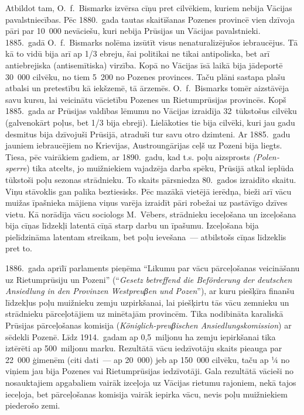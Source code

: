 \documentclass[twoside,a5paper,12pt,fleqn,openany]{extbook}
\newcommand{\detxti}[1]{\textit{\textgerman{#1}}}
\begin{document}
Atbildot tam, O.~f.~Bismarks izvērsa cīņu pret cilvēkiem, kuriem nebija Vācijas pavalstniecības. Pēc 1880.~gada tautas skaitīšanas Pozenes provincē vien dzīvoja pāri par 10~000 nevāciešu, kuri nebija Prūsijas un Vācijas pavalstnieki. 1885.~gadā O.~f.~Bismarks nolēma izsūtīt visus nenaturalizējušos iebraucējus. Tā kā to vidū bija arī ap 1/3 ebreju, šai politikai ne tikai antipoliska, bet arī antiebrejiska (antisemītiska) virzība. Kopā no Vācijas īsā laikā bija jādeportē 30~000 cilvēku, no tiem 5~200 no Pozenes provinces. Taču plāni sastapa plašu atbalsi un pretestību kā iekšzemē, tā ārzemēs. O.~f.~Bismarks tomēr aizstāvēja savu kursu, lai veicinātu vācietību Pozenes un Rietumprūsijas provincēs. Kopš 1885.~gada ar Prūsijas valdības lēmumu no Vācijas izraidīja 32~tūkstošus cilvēku (galvenokārt poļus, bet 1/3 bija ebreji). Lielākoties tie bija cilvēki, kuri jau gadu desmitus bija dzīvojuši Prūsijā, atraduši tur savu otro dzimteni. Ar 1885.~gadu jauniem iebraucējiem no Krievijas, Austroungārijas ceļš uz Pozeni bija liegts. Tiesa, pēc vairākiem gadiem, ar 1890.~gadu, kad t.s. poļu aizsprosts \detxti{(Polensperre}) tika atcelts, jo muižniekiem vajadzēja darba spēku, Prūsijā atkal ieplūda tūkstoši poļu sezonas strādnieku. To skaits pārsniedza 80.~gados izraidīto skaitu. Viņu stāvoklis gan palika beztiesisks. Pēc mazākā vietējā ierēdņa, bieži arī vācu muižas īpašnieka mājiena viņus varēja izraidīt pāri robežai uz pastāvīgo dzīves vietu. Kā norādīja vācu sociologs M.~Vēbers, strādnieku ieceļošana un izceļošana bija cīņas līdzekļi latentā cīņā starp darbu un īpašumu. Izceļošana bija pielīdzināma latentam streikam, bet poļu ievešana~--- atbilstošs cīņas līdzeklis pret to.

1886.~gada aprīlī parlaments pieņēma ``Likumu par vācu pārceļošanas veicināšanu uz Rietumprūsiju un Pozeni'' (``\detxti{Gesetz betreffend die Beförderung der deutschen Ansiedlung in den Provinzen Westpreuβen und Pozen}''), ar kuru piešķīra finanšu līdzekļus poļu muižnieku zemju uzpirkšanai, lai piešķirtu tās vācu zemnieku un strādnieku pārceļotājiem uz minētajām provincēm. Tika nodibināta karaliskā Prūsijas pārceļošanas komisija (\detxti{Königlich-preuβischen Ansiedlungskomission}) ar sēdekli Pozenē. Līdz 1914.~gadam ap 0,5~miljonu ha zemju iepirkšanai tika iztērēti ap 500~miljonu marku. Rezultātā vācu iedzīvotāju skaits pieauga par 22~000 ģimenēm (citi dati~--- ap 20~000) jeb ap 150~000 cilvēku, taču ap ¼ no viņiem jau bija Pozenes vai Rietumprūsijas iedzīvotāji. Gala rezultātā vācieši no nosauktajiem apgabaliem vairāk izceļoja uz Vācijas rietumu rajoniem, nekā tajos ieceļoja, bet pārceļošanas komisija vairāk iepirka vācu, nevis poļu muižniekiem piederošo zemi.
\end{document}

